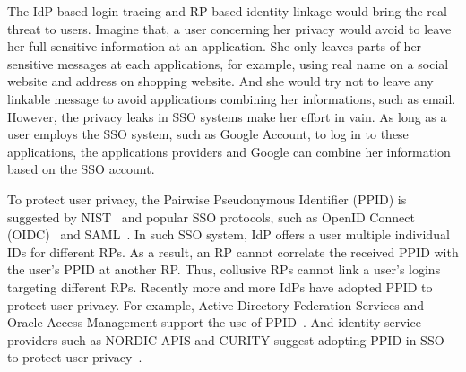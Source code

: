 The IdP-based login tracing and RP-based identity linkage would bring the real threat to users. Imagine that, a user concerning her privacy would avoid to leave her full sensitive information at an application. She only leaves parts of her sensitive messages at each applications, for example, using real name on a social website and address on shopping website. And she would try not to leave any linkable message to avoid applications combining her informations, such as email.
However, the privacy leaks in SSO systems make her effort in vain. As long as a user employs the SSO system, such as Google Account, to log in to these applications, the applications providers and Google can combine her information based on the SSO account.


To protect user privacy, the Pairwise Pseudonymous Identifier (PPID) is suggested by NIST~\cite{NIST2017draft} and popular SSO protocols, such as OpenID Connect (OIDC)~\cite{OpenIDConnect} and SAML~\cite{SAMLIdentifier}. 
In such SSO system, IdP offers a user multiple individual IDs for different RPs. 
As a result, an RP cannot  correlate the received  PPID  with the user's PPID at another RP. Thus, collusive RPs cannot link a user's logins targeting different RPs. 
Recently more and more IdPs have adopted PPID to protect user privacy. For example, Active Directory Federation Services and Oracle Access Management support the use of PPID~\cite{MS, Oracle}. And identity service providers such as NORDIC APIS and CURITY suggest adopting PPID in SSO to protect user privacy~\cite{Nordic, Curity}.

